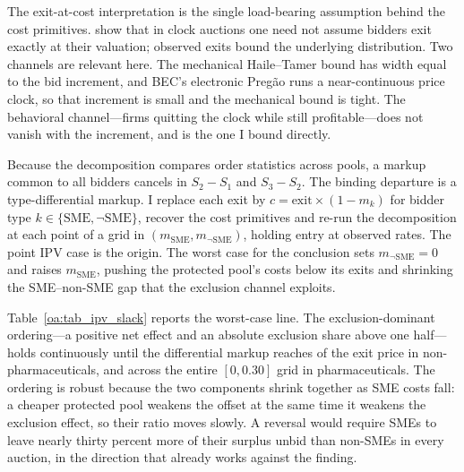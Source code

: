 \documentclass[12pt]{article}
\begin{document}
The exit-at-cost interpretation is the single load-bearing assumption behind
the cost primitives. \citet{haile2003} show that in clock auctions one need
not assume bidders exit exactly at their valuation; observed exits bound the
underlying distribution. Two channels are relevant here. The mechanical
Haile--Tamer bound has width equal to the bid increment, and BEC's electronic
Preg\~ao runs a near-continuous price clock, so that increment is small and
the mechanical bound is tight. The behavioral channel---firms quitting the
clock while still profitable---does not vanish with the increment, and is the
one I bound directly.

Because the decomposition compares order statistics across pools, a markup
common to all bidders cancels in $S_2-S_1$ and $S_3-S_2$. The binding
departure is a type-differential markup. I replace each exit by
$c=\text{exit}\times(1-m_k)$ for bidder type $k\in\{\mathrm{SME},
\neg\mathrm{SME}\}$, recover the cost primitives and re-run the
decomposition at each point of a grid in $(m_{\mathrm{SME}},
m_{\neg\mathrm{SME}})$, holding entry at observed rates. The point IPV case
is the origin. The worst case for the conclusion sets
$m_{\neg\mathrm{SME}}=0$ and raises $m_{\mathrm{SME}}$, pushing the protected
pool's costs below its exits and shrinking the SME--non-SME gap that the
exclusion channel exploits.

Table~\ref{oa:tab_ipv_slack} reports the worst-case line. The
exclusion-dominant ordering---a positive net effect and an absolute exclusion
share above one half---holds continuously until the differential markup
reaches \ipvSlackBreakNp{} of the exit price in non-pharmaceuticals, and across
the entire $[0,0.30]$ grid in pharmaceuticals. The ordering is robust because
the two components shrink together as SME costs fall: a cheaper protected pool
weakens the offset at the same time it weakens the exclusion effect, so their
ratio moves slowly. A reversal would require SMEs to leave nearly thirty
percent more of their surplus unbid than non-SMEs in every auction, in the
direction that already works against the finding.
\end{document}
